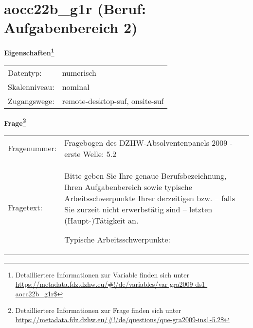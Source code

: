 
    \setcounter{footnote}{0}

    \vspace*{-1.8cm}
	\section{aocc22b\_g1r (Beruf: Aufgabenbereich 2)}
	\label{section:aocc22b_g1r}



    \vspace*{0.5cm}
    \noindent\textbf{Eigenschaften\footnote{Detailliertere Informationen zur Variable finden sich unter
		\url{https://metadata.fdz.dzhw.eu/\#!/de/variables/var-gra2009-ds1-aocc22b_g1r$}}}\\
	\begin{tabularx}{\hsize}{@{}lX}
	Datentyp: & numerisch \\
	Skalenniveau: & nominal \\
	Zugangswege: &
	  remote-desktop-suf, 
	  onsite-suf
 \\
    \end{tabularx}



				\vspace*{0.5cm}
                \noindent\textbf{Frage\footnote{Detailliertere Informationen zur Frage finden sich unter
		              \url{https://metadata.fdz.dzhw.eu/\#!/de/questions/que-gra2009-ins1-5.2$}}}\\
				\begin{tabularx}{\hsize}{@{}lX}
					Fragenummer: &
					  Fragebogen des DZHW-Absolventenpanels 2009 - erste Welle:
					  5.2
 \\
					Fragetext: & Bitte geben Sie Ihre genaue Berufsbezeichnung, Ihren Aufgabenbereich sowie typische Arbeitsschwerpunkte Ihrer derzeitigen bzw. – falls Sie zurzeit nicht erwerbstätig sind – letzten (Haupt-)Tätigkeit an.\par  Typische Arbeitsschwerpunkte: \\
				\end{tabularx}






